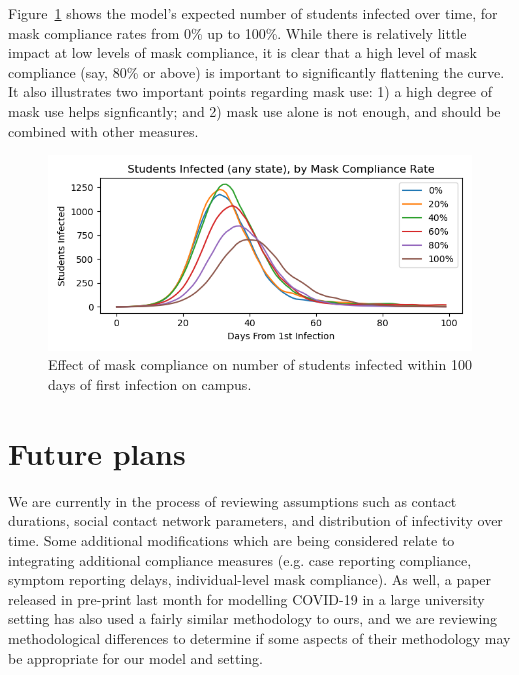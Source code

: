 \documentclass[fleqn,10pt]{SelfArx} %
\begin{document}
Figure~\ref{fig:compliance} shows the model's expected number of students infected over time, for mask compliance rates from 0\% up to 100\%.  While there is relatively little impact at low levels of mask compliance, it is clear that a high level of mask compliance (say, 80\% or above) is important to significantly flattening the curve.  It also illustrates two important points regarding mask use:  1) a high degree of mask use helps signficantly; and 2) mask use alone is not enough, and should be combined with other measures.

\begin{figure}[ht]\centering %
	\includegraphics[width=\linewidth]{mask_compliance}
	\caption{Effect of mask compliance on number of students infected within 100 days of first infection on campus.}
	\label{fig:compliance}
\end{figure}

\section{Future plans}

We are currently in the process of reviewing assumptions such as contact durations, social contact network parameters, and distribution of infectivity over time.    Some additional modifications which are being considered relate to integrating additional compliance measures (e.g. case reporting compliance, symptom reporting delays, individual-level mask compliance).
As well, a paper released in pre-print last month for modelling COVID-19 in a large university setting \cite{gressman2020simulating} has also used a fairly similar methodology to ours, and we are reviewing methodological differences to determine if some aspects of their methodology may be appropriate for our model and setting.
\end{document}
